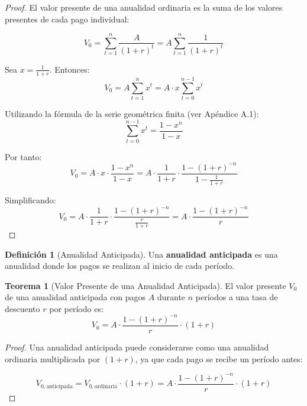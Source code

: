 \documentclass[12pt,a4paper]{article}
\theoremstyle{definition}
\newtheorem{definicion}{Definición}[section]
\newtheorem{teorema}{Teorema}[section]
\begin{document}
\begin{proof}
El valor presente de una anualidad ordinaria es la suma de los valores presentes de cada pago individual:

$$V_0 = \sum_{t=1}^{n} \frac{A}{(1 + r)^t} = A \sum_{t=1}^{n} \frac{1}{(1 + r)^t}$$

Sea $x = \frac{1}{1 + r}$. Entonces:
$$V_0 = A \sum_{t=1}^{n} x^t = A \cdot x \sum_{t=0}^{n-1} x^t$$

Utilizando la fórmula de la serie geométrica finita (ver Apéndice A.1):
$$\sum_{t=0}^{n-1} x^t = \frac{1 - x^n}{1 - x}$$

Por tanto:
$$V_0 = A \cdot x \cdot \frac{1 - x^n}{1 - x} = A \cdot \frac{1}{1 + r} \cdot \frac{1 - (1 + r)^{-n}}{1 - \frac{1}{1 + r}}$$

Simplificando:
$$V_0 = A \cdot \frac{1}{1 + r} \cdot \frac{1 - (1 + r)^{-n}}{\frac{r}{1 + r}} = A \cdot \frac{1 - (1 + r)^{-n}}{r}$$
\end{proof}

\begin{center}
    
\end{center}

\begin{definicion}[Anualidad Anticipada]
Una \textbf{anualidad anticipada} es una anualidad donde los pagos se realizan al inicio de cada período.
\end{definicion}

\begin{teorema}[Valor Presente de una Anualidad Anticipada]
El valor presente $V_0$ de una anualidad anticipada con pagos $A$ durante $n$ períodos a una tasa de descuento $r$ por período es:
\begin{equation}
V_0 = A \cdot \frac{1 - (1 + r)^{-n}}{r} \cdot (1 + r)
\end{equation}
\end{teorema}

\begin{proof}
Una anualidad anticipada puede considerarse como una anualidad ordinaria multiplicada por $(1 + r)$, ya que cada pago se recibe un período antes:

$$V_{0,\text{anticipada}} = V_{0,\text{ordinaria}} \cdot (1 + r) = A \cdot \frac{1 - (1 + r)^{-n}}{r} \cdot (1 + r)$$
\end{proof}

\begin{center}
    
\end{center}
\end{document}
